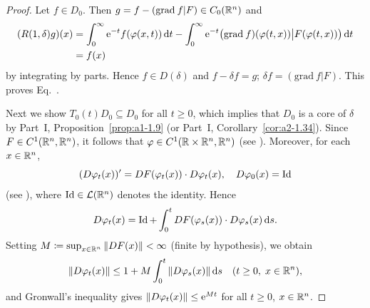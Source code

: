 \begin{proof}
Let $f \in D_{0}$.
Then $g = f - (\mathrm{grad}\: f | F) \in C_{0}(\mathbb{R}^{n})$ and
\begin{equation*}
\begin{split}
(R(1,\delta)g)(x) 
&= \int_{0}^{\infty} \eu^{-t}f(\phi(x,t)) \dt - \int_{0}^{\infty} 
\eu^{-t}\big(\mathrm{grad}\: f)(\phi(t,x)) \big| F(\phi(t,x))\big) \dt \\
&= f(x)
\end{split}
\end{equation*}
 by integrating by parts.
Hence $f \in D(\delta)$ and $f - \delta f = g$; \ie $\delta f = (\mathrm{grad}\: f|F)$.
This proves Eq.~.


Next we show $T_{0}(t)D_{0} \subseteq D_{0}$ for all $t \geq 0$, which implies that $D_{0}$
is a core of\/ $\delta$ by Part~I, Proposition~\ref{prop:a1-1.9}
(or Part~I, Corollary~\ref{cor:a2-1.34}).
Since $F \in C^{1}(\mathbb{R}^{n},\mathbb{R}^{n})$, it follows that
$\phi \in C^{1}(\R \times \R^{n},\R^{n})$
(see \eg \textcite[15.2]{hirschsmale:1974}).
Moreover, for each $x \in \mathbb{R}^{n}$,
\[
    (D\phi_{t}(x))' = DF(\phi_{t}(x)) \cdot D\phi_{t}(x), \quad D\phi_{0}(x) = \Id
\]
(see \textcite[p.\,300]{hirschsmale:1974}), where $\operatorname{Id} \in \mathcal{L}(\mathbb{R}^{n})$ denotes the identity.
Hence
\[
    D\phi_{t}(x) = \Id + \int_{0}^{t} DF(\phi_{s}(x)) \cdot D\phi_{s}(x) \ds.
\]
Setting $M \coloneq \sup_{x \in \mathbb{R}^{n}} \|DF(x)\| < \infty$ (finite by hypothesis),
we obtain
\[
    \|D\phi_{t}(x)\| \leq 1 + M\int_{0}^{t} \|D\phi_{s}(x)\| \ds
    \quad (t \geq 0,\; x \in \R^{n}),
\]
and Gronwall's inequality gives $\|D\phi_{t}(x)\| \leq \eu^{Mt}$ for all $t \geq 0$,
$x \in \mathbb{R}^{n}$.


\end{proof}
